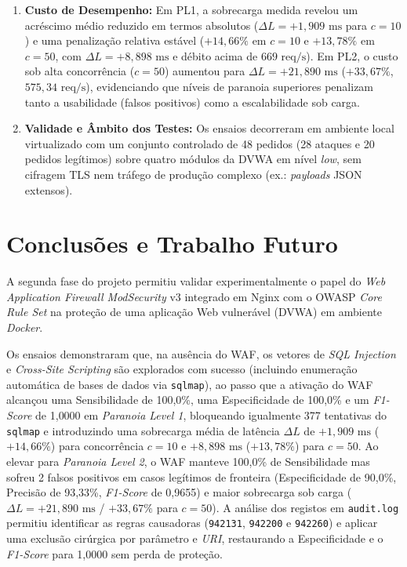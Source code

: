 \documentclass[11pt,a4paper]{article}
\begin{document}
\begin{enumerate}
    \item \textbf{Custo de Desempenho:} Em PL1, a sobrecarga medida revelou um acréscimo médio reduzido em termos absolutos ($\Delta L = +1{,}909\text{ ms}$ para $c=10$) e uma penalização relativa estável ($+14{,}66\%$ em $c=10$ e $+13{,}78\%$ em $c=50$, com $\Delta L = +8{,}898\text{ ms}$ e débito acima de $669\text{ req/s}$). Em PL2, o custo sob alta concorrência ($c=50$) aumentou para $\Delta L = +21{,}890\text{ ms}$ ($+33{,}67\%$, $575{,}34\text{ req/s}$), evidenciando que níveis de paranoia superiores penalizam tanto a usabilidade (falsos positivos) como a escalabilidade sob carga.
    \item \textbf{Validade e Âmbito dos Testes:} Os ensaios decorreram em ambiente local virtualizado com um conjunto controlado de 48 pedidos (28 ataques e 20 pedidos legítimos) sobre quatro módulos da DVWA em nível \textit{low}, sem cifragem TLS nem tráfego de produção complexo (ex.: \textit{payloads} JSON extensos).
\end{enumerate}

\clearpage
\section{Conclusões e Trabalho Futuro}
\label{sec:conclusoes}

A segunda fase do projeto permitiu validar experimentalmente o papel do \textit{Web Application Firewall} \textit{ModSecurity} v3 integrado em Nginx com o OWASP \textit{Core Rule Set} na proteção de uma aplicação Web vulnerável (DVWA) em ambiente \textit{Docker}.

Os ensaios demonstraram que, na ausência do WAF, os vetores de \textit{SQL Injection} e \textit{Cross-Site Scripting} são explorados com sucesso (incluindo enumeração automática de bases de dados via \texttt{sqlmap}), ao passo que a ativação do WAF alcançou uma Sensibilidade de 100{,}0\%, uma Especificidade de 100{,}0\% e um \textit{F1-Score} de 1{,}0000 em \textit{Paranoia Level 1}, bloqueando igualmente 377 tentativas do \texttt{sqlmap} e introduzindo uma sobrecarga média de latência $\Delta L$ de $+1{,}909\text{ ms}$ ($+14{,}66\%$) para concorrência $c=10$ e $+8{,}898\text{ ms}$ ($+13{,}78\%$) para $c=50$. Ao elevar para \textit{Paranoia Level 2}, o WAF manteve 100{,}0\% de Sensibilidade mas sofreu 2 falsos positivos em casos legítimos de fronteira (Especificidade de 90{,}0\%, Precisão de 93{,}33\%, \textit{F1-Score} de 0{,}9655) e maior sobrecarga sob carga ($\Delta L = +21{,}890\text{ ms}$ / $+33{,}67\%$ para $c=50$). A análise dos registos em \texttt{audit.log} permitiu identificar as regras causadoras (\texttt{942131}, \texttt{942200} e \texttt{942260}) e aplicar uma exclusão cirúrgica por parâmetro e \textit{URI}, restaurando a Especificidade e o \textit{F1-Score} para 1{,}0000 sem perda de proteção.
\end{document}
